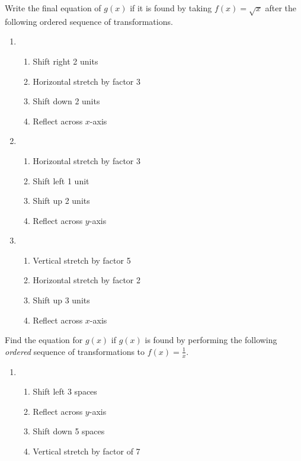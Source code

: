 \documentclass{article}
\newcounter{Review}
\begin{document}
\newpage

Write the final equation of $g(x)$ if it is found by taking $f(x) = \sqrt{x}$ after the following ordered sequence of transformations.   

\begin{enumerate}	\setcounter{enumi}{\value{Review}}
\item \begin{enumerate}[(1)]
\setlength\itemsep{0pt}
    \item Shift right 2 units
    \item Horizontal stretch by factor 3
    \item Shift down 2 units
    \item Reflect across $x$-axis
\end{enumerate}

\item
\begin{enumerate}[(1)]
\setlength\itemsep{0pt}
    \item Horizontal stretch by factor 3
    \item Shift left 1 unit
    \item Shift up 2 units
    \item Reflect across $y$-axis
\end{enumerate}

\item
\begin{enumerate}[(1)]
\setlength\itemsep{0pt}
    \item Vertical stretch by factor 5
    \item Horizontal stretch by factor 2
    \item Shift up 3 units
    \item Reflect across $x$-axis
\end{enumerate}
\setcounter{Review}{\value{enumi}}
\end{enumerate}

Find the equation for $g(x)$ if $g(x)$ is found by performing the following \emph{ordered} sequence of transformations to $f(x)=\frac{1}{x}$.

\begin{enumerate}	\setcounter{enumi}{\value{Review}}
\item \begin{enumerate}[(1)]
\setlength\itemsep{0pt}
	\item Shift left 3 spaces
	\item Reflect across $y$-axis
	\item Shift down 5 spaces
	\item Vertical stretch by factor of 7
\end{enumerate}
\setcounter{Review}{\value{enumi}}
\end{enumerate}
\end{document}
